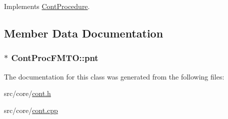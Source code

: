Implements \hyperlink{a00067_a7f7adefe250a00b3778669ef649f03ac}{Cont\-Procedure}.



\subsection{Member Data Documentation}
\hypertarget{a00071_aa39384486319e7ed072a35c1cbe6647b}{
\subsubsection[{pnt}]{$\ast$ Cont\-Proc\-F\-M\-T\-O\-::pnt\hspace{0.3cm}{\ttfamily [private]}}}\label{a00071_aa39384486319e7ed072a35c1cbe6647b}


The documentation for this class was generated from the following files\-:\begin{DoxyCompactItemize}
\item 
src/core/\hyperlink{a00218}{cont.\-h}\item 
src/core/\hyperlink{a00217}{cont.\-cpp}\end{DoxyCompactItemize}
